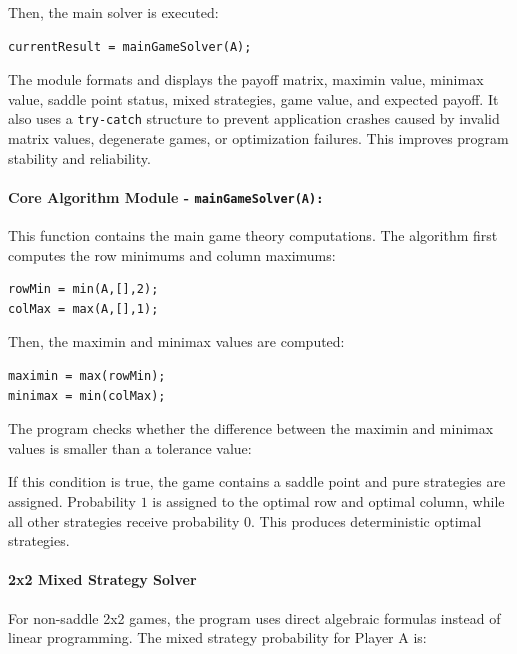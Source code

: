 \documentclass[12pt,a4paper]{article}
\begin{document}
Then, the main solver is executed:

\begin{lstlisting}[style=code]
currentResult = mainGameSolver(A);
\end{lstlisting}

The module formats and displays the payoff matrix, maximin value, minimax value, saddle point status, mixed strategies, game value, and expected payoff. It also uses a \texttt{try-catch} structure to prevent application crashes caused by invalid matrix values, degenerate games, or optimization failures. This improves program stability and reliability.

\paragraph{Core Algorithm Module - \texttt{mainGameSolver(A):}}

This function contains the main game theory computations. The algorithm first computes the row minimums and column maximums:

\begin{lstlisting}[style=code]
rowMin = min(A,[],2);
colMax = max(A,[],1);
\end{lstlisting}

Then, the maximin and minimax values are computed:

\begin{lstlisting}[style=code]
maximin = max(rowMin);
minimax = min(colMax);
\end{lstlisting}

The program checks whether the difference between the maximin and minimax values is smaller than a tolerance value:

\noindent{}

If this condition is true, the game contains a saddle point and pure strategies are assigned. Probability \(1\) is assigned to the optimal row and optimal column, while all other strategies receive probability \(0\). This produces deterministic optimal strategies.

\paragraph{2x2 Mixed Strategy Solver}

For non-saddle 2x2 games, the program uses direct algebraic formulas instead of linear programming. The mixed strategy probability for Player A is:
\end{document}
